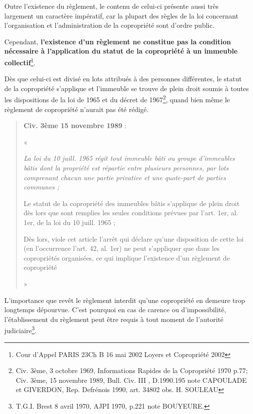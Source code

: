 			Outre l'existence du règlement, le contenu de celui-ci présente aussi très largement un caractère impératif, car la plupart des règles de la loi concernant l'organisation et l'administration de la copropriété sont d'ordre public.
	
			Cependant, \textbf{l'existence d'un règlement ne constitue pas la condition nécessaire à l'application du statut de la copropriété à un immeuble collectif}\footnote{Cour d'Appel PARIS 23\degres Ch B 16 mai 2002 Loyers et Copropriété 2002 }.
			
			Dès que celui-ci est divisé en lots attribués à des personnes différentes, le statut de la copropriété s'applique et l'immeuble se trouve de plein droit soumis à toutes les dispositions de la loi de 1965 et du décret de 1967\footnote{Civ. 3ème, 3 octobre 1969, Informations Rapides de la Copropriété 1970 p.77; Civ. 3ème, 15 novembre 1989, Bull. Civ. III , D.1990.195 note CAPOULADE et GIVERDON, Rep. Defrénois 1990, art. 34802  obs. H. SOULEAU}, quand bien même le règlement de copropriété n’aurait pas été rédigé.
			\begin{quote}
				\textbf{Civ. 3ème 15 novembre 1989} :
				
				« {\itshape La loi du 10 juill. 1965 régit tout immeuble bâti ou groupe d'immeubles bâtis dont la propriété est répartie entre plusieurs personnes, par lots comprenant chacun une partie privative et une quote-part de parties communes ;
				
				Le statut de la copropriété des immeubles bâtis s'applique de plein droit dès lors que sont remplies les seules conditions prévues par l'art. 1er, al. 1er, de la loi du 10 juill. 1965 ;
				
				Dès lors, viole cet article l'arrêt qui déclare qu'une disposition de cette loi (en l'occurrence l'art. 42, al. 1er) ne peut s'appliquer que dans les copropriétés organisées, ce qui implique l'existence d'un règlement de copropriété} »
			\end{quote}
			
			L'importance que revêt le règlement interdit qu'une copropriété en demeure trop longtemps dépourvue. C'est pourquoi en cas de carence ou d'impossibilité, l'établissement du règlement peut être requis à tout moment de l'autorité judiciaire\footnote{T.G.I. Brest 8 avril 1970, AJPI 1970, p.221 note BOUYEURE.}. 
			
